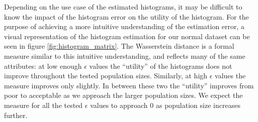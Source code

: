 \documentclass[12pt]{article}
\begin{document}
\begin{description}
    Depending on the use case of the estimated histograms, it may be difficult to know the impact of the histogram error on the utility of the histogram. For the purpose of achieving a more intuitive understanding of the estimation error, a visual representation of the histogram estimation for our normal dataset can be seen in figure \ref{fig:histogram_matrix}. The Wasserstein distance is a formal measure similar to this intuitive understanding, and reflects many of the same attributes: at low enough $\epsilon$ values the ``utility'' of the histograms does not improve throughout the tested population sizes. Similarly, at high $\epsilon$ values the measure improves only slightly. In between these two the ``utility'' improves from poor to acceptable as we approach the larger population sizes. We expect the measure for all the tested $\epsilon$ values to approach 0 as population size increases further.
    

\end{description}
\end{document}
